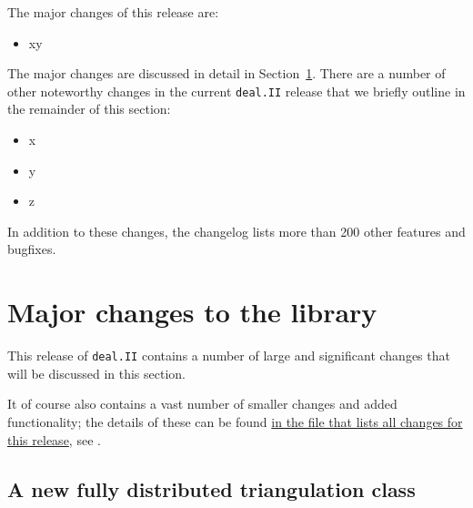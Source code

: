 \documentclass{ansarticle-preprint}
\newcommand{\specialword}[1]{\texttt{#1}}
\newcommand{\dealii}{{\specialword{deal.II}}\xspace}
\begin{document}
The major changes of this release are:
%
\begin{itemize}
\item xy 
\end{itemize}
%
The major changes are discussed in detail in Section~\ref{sec:major}. There
are a number of other noteworthy changes in the current \dealii{} release
that we briefly outline in the remainder of this section:
%
\begin{itemize}
\item x 
\item y 
\item z 
\end{itemize}
%
In addition to these changes, the changelog lists more than 200 other
features and bugfixes.




\section{Major changes to the library}
\label{sec:major}

This release of \dealii contains a number of large and significant changes
that will be discussed in this section.

It of course also contains a
vast number of smaller changes and added functionality; the details of these
can be found
\href{https://dealii.org/developer/doxygen/deal.II/changes_between_9_0_1_and_9_1_0.html}{
in the file that lists all changes for this release}, see \cite{changes91}.


\subsection{A new fully distributed triangulation class}
\label{subsec:pft}
\end{document}
